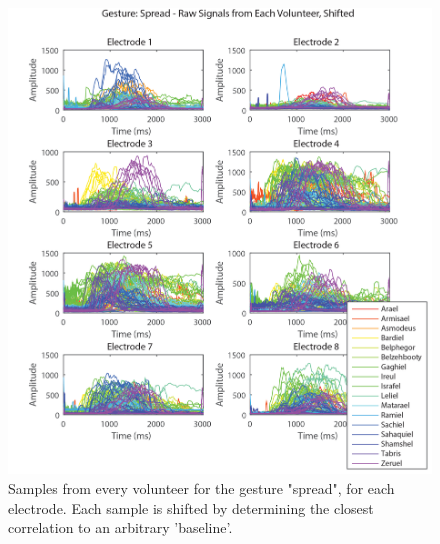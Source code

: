 \documentclass[journal]{IEEEtran}
\begin{document}
    \begin{figure}[H]
    \centering
    \includegraphics[width=1\columnwidth]{EMG/spread_all_correlated}
    \caption{Samples from every volunteer for the gesture "spread", for each electrode. Each sample is shifted by determining the closest correlation to an arbitrary 'baseline'.}
    \label{spread_all_correlated}
    \end{figure}
    
\end{document}

